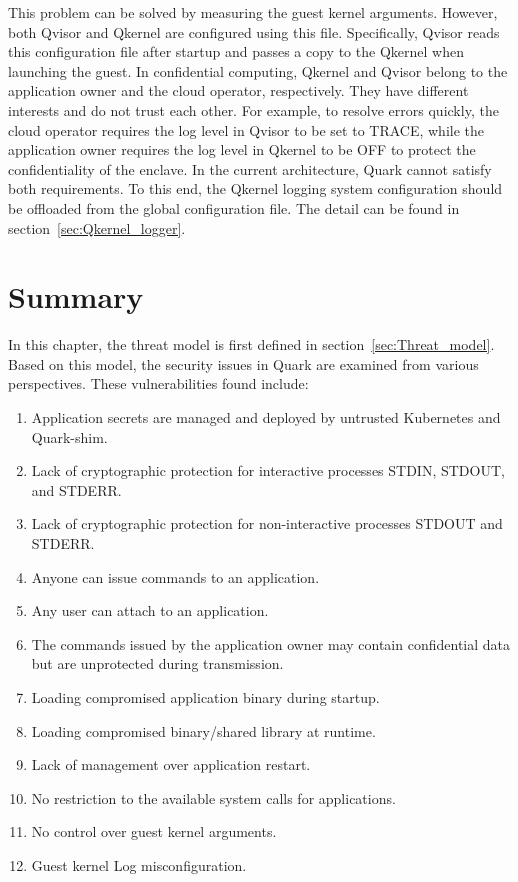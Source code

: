 This problem can be solved by measuring the guest kernel arguments. However, both Qvisor and Qkernel are configured using this file. Specifically, Qvisor reads this configuration file after startup and passes a copy to the Qkernel when launching the guest. In confidential 
computing, Qkernel and Qvisor belong to the application owner and the cloud operator, respectively. They have different interests and do not trust each other. For example, to resolve errors quickly, the cloud operator requires the log level in Qvisor to be set to TRACE, while the application owner 
requires the log level in Qkernel to be OFF to protect the confidentiality of the enclave. In the current architecture, Quark cannot satisfy both requirements. To this end, the Qkernel logging system configuration should be offloaded from the global configuration 
file. The detail can be found in section~\ref{sec:Qkernel_logger}.




\section{Summary}
In this chapter, the threat model is first defined in section~\ref{sec:Threat_model}. Based on this model, the security issues in Quark are examined from various perspectives. These vulnerabilities found include:
\begin{enumerate}
  \item \label{vulnerabilities:1} Application secrets are managed and deployed by untrusted Kubernetes and Quark-shim.
  \item \label{vulnerabilities:2} Lack of cryptographic protection for interactive processes STDIN, STDOUT, and STDERR.
  \item \label{vulnerabilities:3} Lack of cryptographic protection for non-interactive processes STDOUT and STDERR.
  \item \label{vulnerabilities:4} Anyone can issue commands to an application.
  \item \label{vulnerabilities:5} Any user can attach to an application.
  \item \label{vulnerabilities:6} The commands issued by the application owner may contain confidential data but are unprotected during transmission.
  \item \label{vulnerabilities:7} Loading compromised application binary during startup.
  \item \label{vulnerabilities:8} Loading compromised binary/shared library at runtime.
  \item \label{vulnerabilities:9}  Lack of management over application restart.
  \item \label{vulnerabilities:10} No restriction to the available system calls for applications.
  \item \label{vulnerabilities:11} No control over guest kernel arguments.
  \item \label{vulnerabilities:12} Guest kernel Log misconfiguration.

\end{enumerate}

\cleardoublepage

